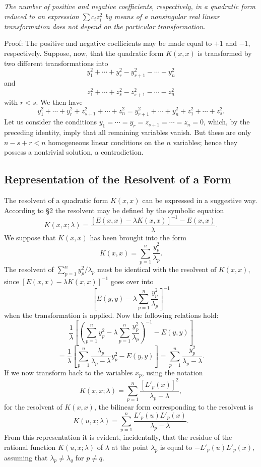 \emph{The number of positive and negative coefficients, respectively, in a quadratic form reduced to an expression $\sum c_i z_i^2$ by means of a nonsingular real linear transformation does not depend on the particular transformation.}

Proof: The positive and negative coefficients may be made equal to $+1$ and $-1$, respectively. Suppose, now, that the quadratic form $K(x,x)$ is transformed by two different transformations into
\[y_1^2+\cdots+y_r^2-y_{r+1}^2-\cdots-y_n^2\]
and
\[z_1^2+\cdots+z_s^2-z_{s+1}^2-\cdots-z_n^2\]
with $r<s$. We then have
\[y_1^2+\cdots+y_r^2+z_{s+1}^2+\cdots+z_n^2=y_{r+1}^2+\cdots+y_n^2+z_1^2+\cdots+z_s^2.\]
Let us consider the conditions $y_1=\cdots=y_r=z_{s+1}=\cdots=z_n=0$, which, by the preceding identity, imply that all remaining variables vanish. But these are only $n-s+r<n$ homogeneous linear conditions on the $n$ variables; hence they possess a nontrivial solution, a contradiction.

\subsection{Representation of the Resolvent of a Form}
The resolvent of a quadratic form $K(x,x)$ can be expressed in a suggestive way. According to \S2 the resolvent may be defined by the symbolic equation
\[K(x,x;\lambda)=\frac{[E(x,x)-\lambda K(x,x)]^{-1}-E(x,x)}{\lambda}.\]
We suppose that $K(x,x)$ has been brought into the form
\[K(x,x)=\sum_{p=1}^n \frac{y_p^2}{\lambda_p}.\]
The resolvent of $\sum_{p=1}^n y_p^2/\lambda_p$ must be identical with the resolvent of $K(x,x)$, since $[E(x,x)-\lambda K(x,x)]^{-1}$ goes over into
\[\left[E(y,y)-\lambda\sum_{p=1}^n\frac{y_p^2}{\lambda_p}\right]^{-1}\]
when the transformation is applied. Now the following relations hold:
\[
\frac1\lambda\left[\left(\sum_{p=1}^n y_p^2-\lambda\sum_{p=1}^n\frac{y_p^2}{\lambda_p}\right)^{-1}-E(y,y)\right]
\]
\[
=\frac1\lambda\left[\sum_{p=1}^n\frac{\lambda_p}{\lambda_p-\lambda}y_p^2-E(y,y)\right]
=\sum_{p=1}^n\frac{y_p^2}{\lambda_p-\lambda}.
\]
If we now transform back to the variables $x_p$, using the notation
\begin{equation}K(x,x;\lambda)=\sum_{p=1}^n\frac{[L'_p(x)]^2}{\lambda_p-\lambda}, \tag{31}\end{equation}
for the resolvent of $K(x,x)$, the bilinear form corresponding to the resolvent is
\begin{equation}K(u,x;\lambda)=\sum_{p=1}^n\frac{L'_p(u)L'_p(x)}{\lambda_p-\lambda}. \tag{32}\end{equation}
From this representation it is evident, incidentally, that the residue of the rational function $K(u,x;\lambda)$ of $\lambda$ at the point $\lambda_p$ is equal to $-L'_p(u)L'_p(x)$, assuming that $\lambda_p\ne\lambda_q$ for $p\ne q$.

